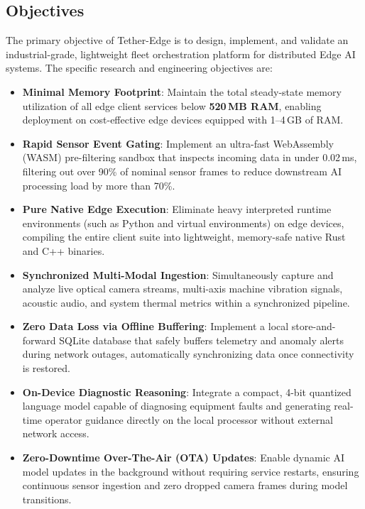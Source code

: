 \documentclass[conference]{IEEEtran}
\begin{document}
    \subsection{Objectives}
    The primary objective of Tether-Edge is to design, implement, and validate an industrial-grade, lightweight fleet orchestration platform for distributed Edge
    AI systems. The specific research and engineering objectives are:
    \begin{itemize}
        \item \textbf{Minimal Memory Footprint}: Maintain the total steady-state memory utilization of all edge client services below \textbf{520\,MB RAM},
        enabling deployment on cost-effective edge devices equipped with 1--4\,GB of RAM.
        \item \textbf{Rapid Sensor Event Gating}: Implement an ultra-fast WebAssembly (WASM) pre-filtering sandbox that inspects incoming data in under 0.02\,ms,
        filtering out over 90\% of nominal sensor frames to reduce downstream AI processing load by more than 70\%.
        \item \textbf{Pure Native Edge Execution}: Eliminate heavy interpreted runtime environments (such as Python and virtual environments) on edge devices,
        compiling the entire client suite into lightweight, memory-safe native Rust and C++ binaries.
        \item \textbf{Synchronized Multi-Modal Ingestion}: Simultaneously capture and analyze live optical camera streams, multi-axis machine vibration signals,
        acoustic audio, and system thermal metrics within a synchronized pipeline.
        \item \textbf{Zero Data Loss via Offline Buffering}: Implement a local store-and-forward SQLite database that safely buffers telemetry and anomaly alerts
        during network outages, automatically synchronizing data once connectivity is restored.
        \item \textbf{On-Device Diagnostic Reasoning}: Integrate a compact, 4-bit quantized language model capable of diagnosing equipment faults and generating
        real-time operator guidance directly on the local processor without external network access.
        \item \textbf{Zero-Downtime Over-The-Air (OTA) Updates}: Enable dynamic AI model updates in the background without requiring service restarts, ensuring 
        continuous sensor ingestion and zero dropped camera frames during model transitions.
    \end{itemize}
\end{document}
